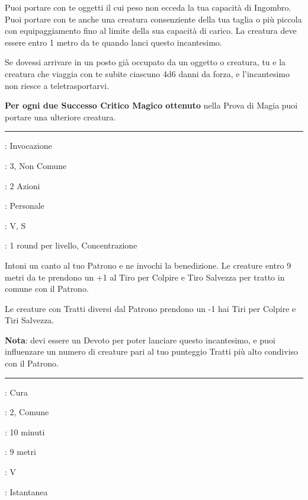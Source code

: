\begin{multicols}{2}
Puoi portare con te oggetti il cui peso non ecceda la tua capacità di Ingombro. Puoi portare con te anche una creatura consenziente della tua taglia o più piccola con equipaggiamento fino al limite della sua capacità di carico. La creatura deve essere entro 1 metro da te quando lanci questo incantesimo.

Se dovessi arrivare in un posto già occupato da un oggetto o creatura, tu e la creatura che viaggia con te subite ciascuno 4d6 danni da forza, e l'incantesimo non riesce a teletrasportarvi.

\textbf{Per ogni due Successo Critico Magico ottenuto} nella Prova di Magia puoi portare una ulteriore creatura.

\smallskip\noindent\rule{\linewidth}{2pt} \hypertarget{Preghiera}{}\smallskip{}
\noindent
\begin{description}[noitemsep, topsep=0pt, parsep=0pt, partopsep=0pt, leftmargin=0cm, labelwidth=2.8cm]
	\item[\textbf{Lista di Magia}]: Invocazione
	\item[\textbf{Livello}]: 3, Non Comune
	\item[\textbf{T. di Lancio}]: 2 Azioni
	\item[\textbf{Gittata}]: Personale
	\item[\textbf{Componenti}]: V, S
	\item[\textbf{Durata}]: 1 round per livello, Concentrazione
\end{description}

Intoni un canto al tuo Patrono e ne invochi la benedizione. Le creature entro 9 metri da te prendono un +1 al Tiro per Colpire e Tiro Salvezza per tratto in comune con il Patrono.

Le creature con Tratti diversi dal Patrono prendono un -1 hai Tiri per Colpire e Tiri Salvezza.

\textbf{Nota}: devi essere un Devoto per poter lanciare questo incantesimo, e puoi influenzare un numero di creature pari al tuo punteggio Tratti più alto condiviso con il Patrono.

\smallskip\noindent\rule{\linewidth}{2pt} \hypertarget{Preghiera di Guarigione}{}\smallskip{}
\noindent
\begin{description}[noitemsep, topsep=0pt, parsep=0pt, partopsep=0pt, leftmargin=0cm, labelwidth=2.8cm]
	\item[\textbf{Lista di Magia}]: Cura
	\item[\textbf{Livello}]: 2, Comune
	\item[\textbf{T. di Lancio}]: 10 minuti
	\item[\textbf{Gittata}]: 9 metri
	\item[\textbf{Componenti}]: V
	\item[\textbf{Durata}]: Istantanea
\end{description}


\end{multicols}
